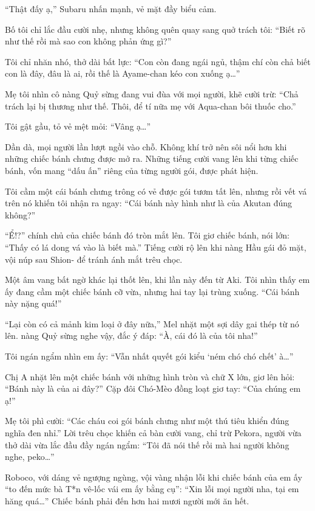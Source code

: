 \documentclass[../main.tex]{subfiles}
\begin{document}
``Thật đấy ạ,'' Subaru nhấn mạnh, vẻ mặt đầy biểu cảm.

Bố tôi chỉ lắc đầu cười nhẹ, nhưng không quên quay sang quở trách tôi: ``Biết rõ như thế rồi mà sao con không phản ứng gì?''

Tôi chỉ nhăn nhó, thở dài bất lực: ``Con còn đang ngái ngủ, thậm chí còn chả biết con là đây, đâu là ai, rồi thế là Ayame-chan kéo con xuống ạ\dots''

Mẹ tôi nhìn cô nàng Quỷ sừng đang vui đùa với mọi người, khẽ cười trừ: ``Chả trách lại bị thương như thế. Thôi, để tí nữa mẹ với Aqua-chan bôi thuốc cho.''

Tôi gật gầu, tỏ vẻ mệt mỏi: ``Vâng ạ\dots''

Dần dà, mọi người lần lượt ngồi vào chỗ. Không khí trở nên sôi nổi hơn khi những chiếc bánh chưng được mở ra. Những tiếng cười vang lên khi từng chiếc bánh, vốn mang ``dấu ấn'' riêng của từng người gói, được phát hiện.

Tôi cầm một cái bánh chưng trông có vẻ được gói tươm tất lên, nhưng rồi vết vá trên nó khiến tôi nhận ra ngay: ``Cái bánh này hình như là của Akutan đúng không?''

``Ể!?'' chính chủ của chiếc bánh đó tròn mắt lên. Tôi giơ chiếc bánh, nói lớn: ``Thấy có lá dong vá vào là biết mà.'' Tiếng cười rộ lên khi nàng Hầu gái đỏ mặt, vội núp sau Shion- để tránh ánh mắt trêu chọc.

Một âm vang bất ngờ khác lại thốt lên, khi lần này đến từ Aki. Tôi nhìn thấy em ấy đang cầm một chiếc bánh cỡ vừa, nhưng hai tay lại trùng xuống. ``Cái bánh này nặng quá!''

``Lại còn có cả mảnh kim loại ở đây nữa,'' Mel nhặt một sợi dây gai thép từ nó lên. nàng Quỷ sừng nghe vậy, đắc ý đáp: ``À, cái đó là của tôi nha!''

Tôi ngán ngẩm nhìn em ấy: ``Vẫn nhất quyết gói kiểu `ném chó chó chết' à\dots''

Chị A nhặt lên một chiếc bánh với những hình tròn và chữ X lớn, giơ lên hỏi: ``Bánh này là của ai đây?'' Cặp đôi Chó-Mèo đồng loạt giơ tay: ``Của chúng em ạ!''

Mẹ tôi phì cười: ``Các cháu coi gói bánh chưng như một thú tiêu khiển đúng nghĩa đen nhỉ.'' Lời trêu chọc khiến cả bàn cười vang, chỉ trừ Pekora, người vừa thở dài vừa lắc đầu đầy ngán ngẩm: ``Tôi đã nói thế rồi mà hai người không nghe, peko\dots''

Roboco, với dáng vẻ ngượng ngùng, vội vàng nhận lỗi khi chiếc bánh của em ấy ``to đến mức bà T*n vê-lốc vái em ấy bằng cụ'': ``Xin lỗi mọi người nha, tại em hăng quá\dots'' Chiếc bánh phải đến hơn hai mươi người mới ăn hết.
\end{document}

